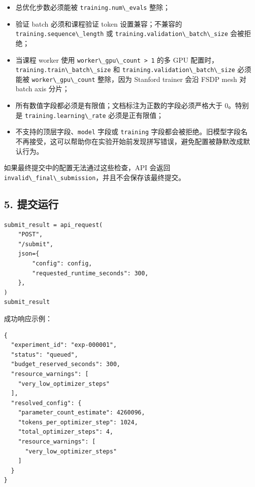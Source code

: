 \documentclass[
]{ctexart}
\newcommand{\passthrough}[1]{#1}
\begin{document}
\begin{itemize}
  总优化步数等于 \passthrough{\lstinline!training.train\_tokens!} 除以
  \passthrough{\lstinline!training.sequence\_length * training.train\_batch\_size!}；
\item
  总优化步数必须能被
  \passthrough{\lstinline!training.num\_evals!} 整除；
\item
  验证 batch 必须和课程验证 token 设置兼容；不兼容的
  \passthrough{\lstinline!training.sequence\_length!} 或
  \passthrough{\lstinline!training.validation\_batch\_size!} 会被拒绝；
\item
  当课程 worker 使用 \passthrough{\lstinline!worker\_gpu\_count > 1!}
  的多 GPU 配置时，
  \passthrough{\lstinline!training.train\_batch\_size!} 和
  \passthrough{\lstinline!training.validation\_batch\_size!} 必须能被
  \passthrough{\lstinline!worker\_gpu\_count!} 整除，因为 Stanford
  trainer 会沿 FSDP mesh 对 batch axis 分片；
\item
  所有数值字段都必须是有限值；文档标注为正数的字段必须严格大于 0。特别是
  \passthrough{\lstinline!training.learning\_rate!} 必须是正有限值；
\item
  不支持的顶层字段、\passthrough{\lstinline!model!} 字段或
  \passthrough{\lstinline!training!}
  字段都会被拒绝。旧模型字段名不再接受，这可以帮助你在实验开始前发现拼写错误，避免配置被静默改成默认行为。
\end{itemize}

如果最终提交中的配置无法通过这些检查，API 会返回
\passthrough{\lstinline!invalid\_final\_submission!}，并且不会保存该最终提交。

\hypertarget{ux63d0ux4ea4ux8fd0ux884c}{%
\subsection{5. 提交运行}\label{ux63d0ux4ea4ux8fd0ux884c}}

\begin{verbatim}
submit_result = api_request(
    "POST",
    "/submit",
    json={
        "config": config,
        "requested_runtime_seconds": 300,
    },
)
submit_result
\end{verbatim}

成功响应示例：

\begin{verbatim}
{
  "experiment_id": "exp-000001",
  "status": "queued",
  "budget_reserved_seconds": 300,
  "resource_warnings": [
    "very_low_optimizer_steps"
  ],
  "resolved_config": {
    "parameter_count_estimate": 4260096,
    "tokens_per_optimizer_step": 1024,
    "total_optimizer_steps": 4,
    "resource_warnings": [
      "very_low_optimizer_steps"
    ]
  }
}
\end{verbatim}
\end{document}
